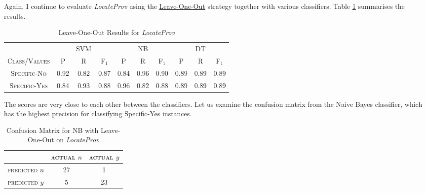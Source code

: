 Again, I continue to evaluate {\it LocateProv} using the \url{Leave-One-Out} strategy together with various classifiers. Table \ref{tab:secondtieresults} summarises the results.

\begin{table}[h]
	\center
	\begin{tabular}{ c | c  c  c | c c c | c c c}
		& & SVM & & & NB & & & DT \\
		\textsc{Class/Values} & \textsc{P} & \textsc{R} & \textsc{F$_1$} & \textsc{P} & \textsc{R} & \textsc{F$_1$} & \textsc{P} & \textsc{R} & \textsc{F$_1$} \\
		\hline
		\textsc{Specific-No} 			& 0.92  &    0.82   &   0.87 & 0.84   &   0.96   &   0.90 & 0.89  &    0.89  &    0.89 \\
		\textsc{Specific-Yes} 			& 0.84  &    0.93   &   0.88 & 0.96   &   0.82   &   0.88 & 0.89  &    0.89  &    0.89 \\
	\end{tabular}
	\caption{Leave-One-Out Results for {\it LocateProv}}
	\label{tab:secondtieresults}
\end{table}
The scores are very close to each other between the classifiers. Let us examine the confusion matrix from the Naive Bayes classifier, which has the highest precision for classifying Specific-Yes instances.

\begin{table}[h]
	\center
	\begin{tabular}{ c | c  c }
		 & \textsc{actual $n$} & \textsc{actual $y$} \\
		\hline
		\textsc{predicted $n$} 	& 27 & 1 \\
		\textsc{predicted $y$}		& 5 & 23
	\end{tabular}
	\caption{Confusion Matrix for NB with Leave-One-Out on {\it LocateProv}}
	\label{tab:secondnbconfusionmatrix}
\end{table}

